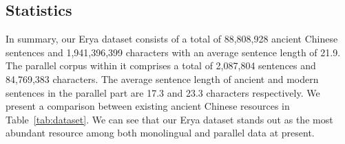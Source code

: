 


\subsection{Statistics}

In summary, our Erya dataset consists of a total of 88,808,928 ancient Chinese sentences and 1,941,396,399 characters with an average sentence length of 21.9. The parallel corpus within it comprises a total of 2,087,804 sentences and 84,769,383 characters. The average sentence length of ancient and modern sentences in the parallel part are 17.3 and 23.3 characters respectively. We present a comparison between existing ancient Chinese resources in Table~\ref{tab:dataset}. We can see that our Erya dataset stands out as the most abundant resource among both monolingual and parallel data at present.

